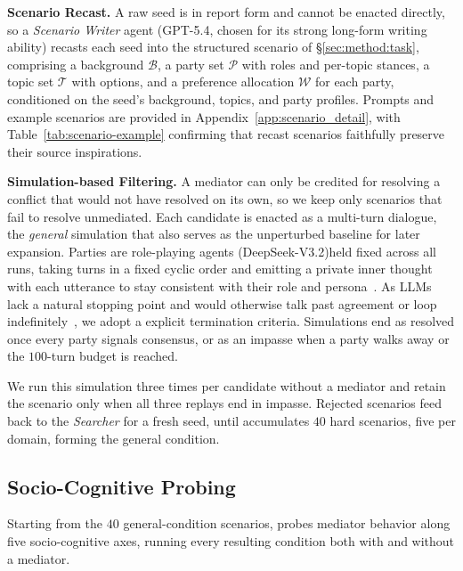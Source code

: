 \smallskip\smallskip\noindent\textbf{{Scenario Recast.}}
A raw seed is in report form and cannot be enacted directly, so a \textit{Scenario Writer} agent (GPT-5.4, chosen for its strong long-form writing ability) recasts each seed into the structured scenario of \S\ref{sec:method:task}, comprising a background $\mathcal{B}$, a party set $\mathcal{P}$ with roles and per-topic stances, a topic set $\mathcal{T}$ with options, and a preference allocation $\mathcal{W}$ for each party, conditioned on the seed's background, topics, and party profiles. Prompts and example scenarios are provided in Appendix~\ref{app:scenario_detail}, with Table~\ref{tab:scenario-example} confirming that recast scenarios faithfully preserve their source inspirations.

\smallskip\smallskip\noindent\textbf{{Simulation-based Filtering.}}
A mediator can only be credited for resolving a conflict that would not have resolved on its own, so we keep only scenarios that fail to resolve unmediated. Each candidate is enacted as a multi-turn dialogue, the \emph{general} simulation that also serves as the unperturbed baseline for later expansion. Parties are role-playing agents (DeepSeek-V3.2)\footnotemark[1] held fixed across all runs, taking turns in a fixed cyclic order and emitting a private inner thought with each utterance to stay consistent with their role and persona~\citep{liu2025proactive, liu2025promediate}. As LLMs lack a natural stopping point and would otherwise talk past agreement or loop indefinitely~\citep{hu2026multi}, we adopt a explicit termination criteria. Simulations end as resolved once every party signals consensus, or as an impasse when a party walks away or the $100$-turn budget is reached.


We run this simulation three times per candidate without a mediator and retain the scenario only when all three replays end in impasse. Rejected scenarios feed back to the \textit{Searcher} for a fresh seed, until \algname{} accumulates $40$ hard scenarios, five per domain, forming the general condition.

\subsection{Socio-Cognitive Probing}
\label{sec:method:simulation}

Starting from the $40$ general-condition scenarios, \algname{} probes mediator behavior along five socio-cognitive axes, running every resulting condition both with and without a mediator.

